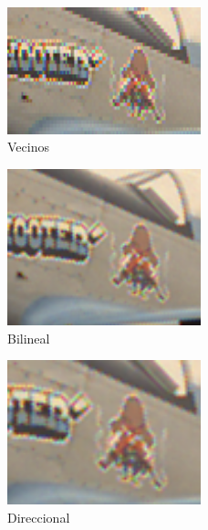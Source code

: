 {\begin{figure}
\begin{center}
       \includegraphics[width=0.5\textwidth]{imagenes/img9_demosicing_vecino_cropped.png}
        \caption{Vecinos}
\end{center}
\end{figure}

\begin{figure}
\begin{center}
       \includegraphics[width=0.5\textwidth]{imagenes/img9_demosicing_bilineal_cropped.png}
        \caption{Bilineal}
\end{center}
\end{figure}


\begin{figure}
\begin{center}
       \includegraphics[width=0.5\textwidth]{imagenes/img9_demosicing_spline_cropped.png}
        \caption{Direccional}
\end{center}
\end{figure}


}
